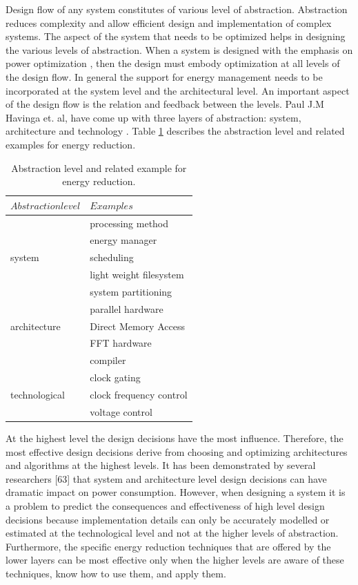  Design flow of any system constitutes of various level of abstraction. Abstraction reduces complexity  and allow efficient design and implementation of complex systems. The aspect of the system that needs to be optimized helps in designing the various levels of abstraction. When a system is designed with the emphasis on power optimization , then the design must embody optimization at all levels of the design flow. In general the support for energy management needs to be incorporated at the system level and the architectural level. An important aspect of the design flow is the relation and feedback between the levels. Paul J.M Havinga et. al, 
 have come up with three layers of abstraction: system, architecture and technology \cite{havinga,havinga2,havinga3}. Table \ref{table:abstraction} describes the abstraction level and related examples for energy reduction.
 \begin{table}
 	\centering
 	\begin{tabular}{|l|l|}
 		\hline
 		$Abstraction level$ & $Examples$  \\
 		\hline
 		  & processing method \\
 		  & energy manager \\
 		  system & scheduling \\
 		  & light weight filesystem \\
 		  & system partitioning \\
 		  & parallel hardware \\
 		  architecture & Direct Memory Access \\
 		  & FFT hardware \\
 		  & compiler \\
 		  & clock gating \\
 		  technological & clock frequency control \\
 		  & voltage control \\
 		\hline
 	\end{tabular}
 	\caption{Abstraction level and related example for energy reduction.}
 	\label{table:abstraction}
 \end{table}


 At the highest level the design decisions have the most influence. 
 Therefore, the most effective design decisions derive from choosing and optimizing 
 architectures and algorithms at the highest levels. It has been demonstrated by several 
 researchers [63] that system and architecture level design decisions can have dramatic 
 impact on power consumption. However, when designing a system it is a problem to 
 predict the consequences and effectiveness of high level design decisions because implementation details can only be accurately modelled or estimated at the technological 
 level and not at the higher levels of abstraction. Furthermore, the specific energy 
 reduction techniques that are offered by the lower layers can be most effective only 
 when the higher levels are aware of these techniques, know how to use them, and apply 
 them.
 
